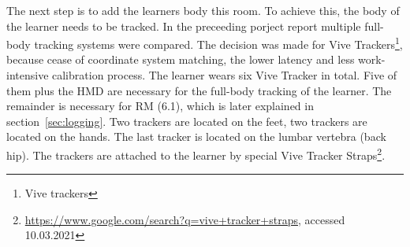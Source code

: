 The next step is to add the learners body this room. To achieve this, the body of the learner needs to be tracked. In the preceeding porject report multiple full-body tracking systems were compared. The decision was made for Vive Trackers\footnote{Vive trackers}, because cease of coordinate system matching, the lower latency and less work-intensive calibration process. The learner wears six Vive Tracker in total. Five of them plus the HMD are necessary for the full-body tracking of the learner. The remainder is necessary for RM (6.1), which is later explained in section~\ref{sec:logging}. Two trackers are located on the feet, two trackers are located on the hands. The last tracker is located on the lumbar vertebra (back hip). The trackers are attached to the learner by special Vive Tracker Straps\footnote{\href{https://www.google.com/search?q=vive+tracker+straps}{https://www.google.com/search?q=vive+tracker+straps}, accessed 10.03.2021}.\\
